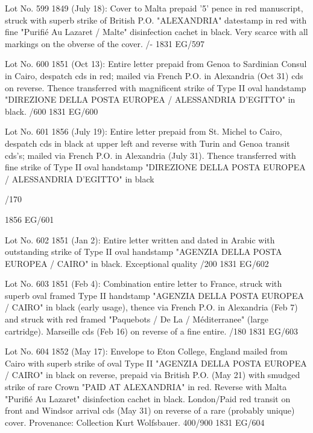 \documentclass[justified]{tufte-book}
\begin{document}
%
{Lot No. 599
1849 (July 18): Cover to Malta prepaid '5' pence in red manuscript, struck with superb strike of British P.O. "ALEXANDRIA" datestamp in red with fine "Purifié Au Lazaret / Malte" disinfection cachet in black. Very scarce with all markings on the obverse of the cover. /- }%
{1831}%
{EG/597}%
{}%
{}
{}%
{}


%
{Lot No. 600
1851 (Oct 13): Entire letter prepaid from Genoa to Sardinian Consul in Cairo, despatch cds in red; mailed via French P.O. in Alexandria (Oct 31) cds on reverse. Thence transferred with magnificent strike of Type II oval handstamp "DIREZIONE DELLA POSTA EUROPEA / ALESSANDRIA D'EGITTO" in black. /600 }%
{1831}%
{EG/600}%
{}%
{}
{}%
{}

%
{Lot No. 601
1856 (July 19): Entire letter prepaid from St. Michel to Cairo, despatch cds in black at upper left and reverse with Turin and Genoa transit cds's; mailed via French P.O. in Alexandria (July 31). Thence transferred with fine strike of Type II oval handstamp "DIREZIONE DELLA POSTA EUROPEA / ALESSANDRIA D'EGITTO" in black 

/170 }%
{1856}%
{EG/601}%
{}%
{}
{}%
{}

%
{ Lot No. 602
1851 (Jan 2): Entire letter written and dated in Arabic with outstanding strike of Type II oval handstamp "AGENZIA DELLA POSTA EUROPEA / CAIRO" in black. Exceptional quality 
/200 
}%
{1831}%
{EG/602}%
{}%
{}
{}%
{}


%
{Lot No. 603
1851 (Feb 4): Combination entire letter to France, struck with superb oval framed Type II handstamp "AGENZIA DELLA POSTA EUROPEA / CAIRO" in black (early usage), thence via French P.O. in Alexandria (Feb 7) and struck with red framed "Paquebots / De La / Méditerranee" (large cartridge). Marseille cds (Feb 16) on reverse of a fine entire. 
/180 }%
{1831}%
{EG/603}%
{}%
{}
{}%
{}


%
{Lot No. 604
1852 (May 17): Envelope to Eton College, England mailed from Cairo with superb strike of oval Type II "AGENZIA DELLA POSTA EUROPEA / CAIRO" in black on reverse, prepaid via British P.O. (May 21) with smudged strike of rare Crown "PAID AT ALEXANDRIA" in red. Reverse with Malta "Purifié Au Lazaret" disinfection cachet in black. London/Paid red transit on front and Windsor arrival cds (May 31) on reverse of a rare (probably unique) cover. Provenance: Collection Kurt Wolfsbauer. 400/900 }%
{1831}%
{EG/604}%
{}%
{}
{}%
{}
\end{document}
